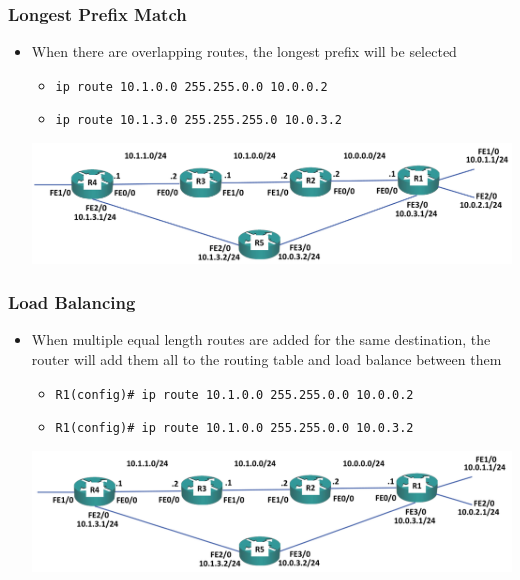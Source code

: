 \documentclass[pdflatex,compress,mathserif]{beamer}
\begin{document}
\begin{frame}
	\frametitle{Longest Prefix Match}
	\begin{itemize}
		\item When there are overlapping routes, the longest prefix will be selected
		\begin{itemize}
			\item[] \texttt{ip route 10.1.0.0 255.255.0.0 10.0.0.2}
			\item[] \texttt{ip route 10.1.3.0 255.255.255.0 10.0.3.2}
		\end{itemize}
		\begin{center}
			\includegraphics[width=\linewidth]{img/img09}
		\end{center}
	\end{itemize}
\end{frame}

\begin{frame}
	\frametitle{Load Balancing}
	\begin{itemize}
		\item When multiple equal length routes are added for the same destination, the router will add them all to the routing table and load balance between them
		\begin{itemize}
			\item[] \texttt{R1(config)\# ip route 10.1.0.0 255.255.0.0 10.0.0.2}
			\item[] \texttt{R1(config)\# ip route 10.1.0.0 255.255.0.0 10.0.3.2}
		\end{itemize}
		\begin{center}
			\includegraphics[width=\linewidth]{img/img10}
		\end{center}
	\end{itemize}
\end{frame}
\end{document}
